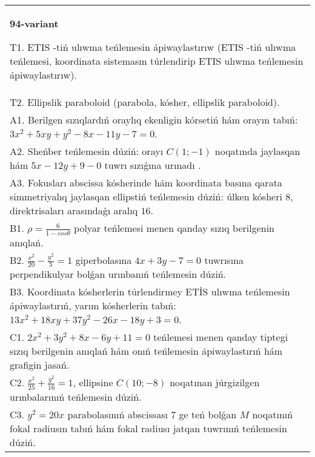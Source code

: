 \documentclass{article}
\begin{document}
\begin{tabular}{m{17cm}}
\textbf{94-variant}
\newline

T1. ETIS -tiń ulıwma teńlemesin ápiwaylastırıw (ETIS -tiń ulıwma teńlemesi, koordinata sistemasın túrlendirip ETIS ulıwma teńlemesin ápiwaylastırıw).\\

T2. Ellipslik paraboloid (parabola, kósher, ellipslik paraboloid).\\

A1. Berilgen sızıqlardıń oraylıq ekenligin kórsetiń hám orayın tabıń: $3 x^{2}+5 xy+y^{2}-8 x-11 y-7=0$.\\

A2. Sheńber teńlemesin dúziń: orayı $C (1;-1) $ noqatında jaylasqan hám $5 x-12 y+9 -0$ tuwrı sızıǵına urınadı .\\

A3. Fokusları abscissa kósherinde hám koordinata basına qarata simmetriyalıq jaylasqan ellipstiń teńlemesin dúziń: úlken kósheri $8$, direktrisaları arasındaǵı aralıq $16$.\\

B1. $\rho = \frac{6}{1 - cos\theta}$ polyar teńlemesi menen qanday sızıq berilgenin anıqlań.  \\

B2. $\frac{x^{2}}{20} - \frac{y^{2}}{5} = 1$ giperbolasına $4x + 3y - 7 = 0$ tuwrısına perpendikulyar bolǵan urınbanıń teńlemesin dúziń.  \\

B3. Koordinata kósherlerin túrlendirmey ETİS ulıwma teńlemesin ápiwaylastırıń, yarım kósherlerin tabıń: $13x^{2} + 18xy + 37y^{2} - 26x - 18y + 3 = 0$.  \\

C1. $2x^{2} + 3y^{2} + 8x - 6y + 11 = 0$ teńlemesi menen qanday tiptegi sızıq berilgenin anıqlań hám onıń teńlemesin ápiwaylastırıń hám grafigin jasań.  \\

C2. $\frac{x^{2}}{25} + \frac{y^{2}}{16} = 1$, ellipsine $C(10; - 8)$ noqatınan júrgizilgen urınbalarınıń teńlemesin dúziń.  \\

C3. $y^{2} = 20x$ parabolasınıń abscissası 7 ge teń bolǵan $M$ noqatınıń fokal radiusın tabıń hám fokal radiusı jatqan tuwrınıń teńlemesin dúziń.  \\

\end{tabular}
\vspace{1cm}
\end{document}
